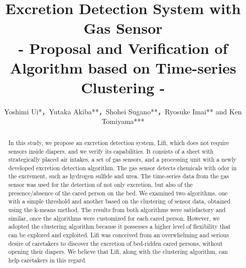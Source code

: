 \documentclass[publish,JRM,paper]{jaciiiarticle}
\begin{document}
\pagestyle{jaciiistyle}

\title{Excretion Detection System with Gas Sensor\\ \Large{- Proposal and Verification of Algorithm based on Time-series Clustering -}}
\author{Yoshimi Ui*，Yutaka Akiba**，Shohei Sugano**，Ryosuke Imai** and Ken Tomiyama***}
\address{*aba Inc.\\ 3-30-5 Maebara Higashi, Funabashi, Chiba 274-0824, Japan\\ E-mail: yoshimi.wie@aba-lab.com\\
**Chiba Institute of Technology\\ 2-17-1 Tsudanuma, Narashino, Chiba 275-0016, Japan\\
E-mail: \{utahka.akiba, shohei.sugano, rimai.robo.cit\}@gmail.com\\
***Future Robotics Technology Center (fuRo)\\
Chiba Institute of Technology\\
2-17-1 Tsudanuma, Narashino, Chiba 275-0016, Japan\\
E-mail: dr.t@furo.org}
\maketitle

\begin{abstract}%
\noindent In this study, we propose an excretion detection system, Lifi, which does not require sensors inside diapers, and we verify its capabilities. It consists of a sheet with strategically placed air intakes, a set of gas sensors, and a processing unit with a newly developed excretion detection algorithm. The gas sensor detects chemicals with odor in the excrement, such as hydrogen sulfide and urea. The time-series data from the gas sensor was used for the detection of not only excretion, but also of the presence/absence of the cared person on the bed. We examined two algorithms, one with a simple threshold and another based on the clustering of sensor data, obtained using the k-means method. The results from both algorithms were satisfactory and similar, once the algorithms were customized for each cared person. However, we adopted the clustering algorithm because it possesses a higher level of flexibility that can be explored and exploited. Lifi was conceived from an overwhelming and serious desire of caretakers to discover the excretion of bed-ridden cared persons, without opening their diapers. We believe that Lifi, along with the clustering algorithm, can help caretakers in this regard.
\end{abstract}
\end{document}
